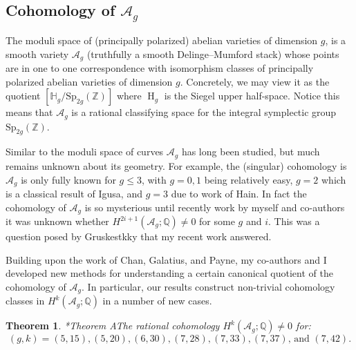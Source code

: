 \documentclass[11pt,reqno]{amsart}
\newtheorem{theorem}[lemma]{Theorem}
\theoremstyle{remark}
\renewcommand{\H}{\operatorname{H}}
\newcommand{\cA}{\mathcal{A}}
\newcommand{\cM}{\mathcal{M}}
\newcommand{\Q}{\mathbb{Q}}
\newcommand{\Z}{\mathbb{Z}}
\begin{document}





\subsection{Cohomology of $\cA_{g}$}

The moduli space of (principally polarized) abelian varieties of dimension $g$, is a smooth variety $\cA_{g}$ (truthfully a smooth Delinge--Mumford stack) whose points are in one to one correspondence with isomorphism classes of principally polarized abelian varieties of dimension $g$. Concretely, we may view it as the quotient $[\mathbb{H}_g/\mathrm{Sp}_{2g}(\Z)]$ where $\H_{g}$ is the Siegel upper half-space. Notice this means that $\cA_{g}$  is a rational classifying space for the integral symplectic group $\mathrm{Sp}_{2g}(\Z)$. 

Similar to the moduli space of curves $\cA_{g}$ has long been studied, but much remains unknown about its geometry. For example, the (singular) cohomology is $\cA_{g}$ is only fully known for $g\leq 3$, with $g=0,1$ being relatively easy, $g=2$ which is a classical result of Igusa, and $g=3$ due to work of Hain. In fact the cohomology of $\cA_{g}$ is so mysterious until recently work by myself and co-authors it was unknown whether $H^{2i+1}(\cA_{g};\Q)\neq0$ for some $g$ and $i$. This was a question posed by Gruskestkky that my recent work answered. 

Building upon the work of Chan, Galatius, and Payne, my co-authors and I developed new methods for understanding a certain canonical quotient of the cohomology of $\cA_{g}$. In particular, our results construct non-trivial cohomology classes in $H^{k}(\cA_{g}; \Q)$ in a number of new cases. 

\begin{theorem}\cite{BBCMMW22}*{Theorem A}\label{thm:Ag}
The rational cohomology $H^{k}\left(\cA_{g};\Q\right)\neq0$ for:
\[
\text{$(g,k)=(5,15),(5,20),(6,30),(7,28),(7,33),(7,37)$, and $(7,42)$}.
\]
\end{theorem}
\end{document}
